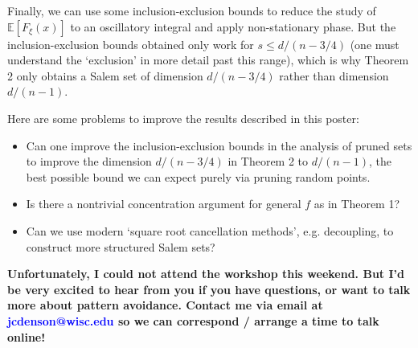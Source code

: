 \documentclass[12pt]{article}
\numberwithin{equation}{section}
\theoremstyle{plain}
\theoremstyle{remark}
\newcommand{\newpart}[1]
{\colorbox[rgb]{0.97,0.92,0.7}{\makebox[0.97\columnwidth]
{\rule[-1.2ex]{0pt}{3.7ex}\partfont{#1}}}\bigskip}
\newcommand{\partfont}[1]{{\Large \textsf{\textbf{#1}}}}
\begin{document}
{{\begin{multicols}{2}
{\vspace{0.1cm}

Finally, we can use some inclusion-exclusion bounds to reduce the study of $\mathbb{E}[F_\xi(x)]$ to an oscillatory integral and apply non-stationary phase. But the inclusion-exclusion bounds obtained only work for $s \leq d/(n-3/4)$ (one must understand the `exclusion' in more detail past this range), which is why Theorem 2 only obtains a Salem set of dimension $d/(n-3/4)$ rather than dimension $d/(n-1)$.
}

\vspace{0.2cm}

\newpart{What's Next}

\large{Here are some problems to improve the results described in this poster:

\begin{itemize}
    \item Can one improve the inclusion-exclusion bounds in the analysis of pruned sets to improve the dimension $d/(n-3/4)$ in Theorem 2 to $d/(n-1)$, the best possible bound we can expect purely via pruning random points.

    \item Is there a nontrivial concentration argument for general $f$ as in Theorem 1?


    \item Can we use modern `square root cancellation methods', e.g. decoupling, to construct more structured Salem sets?
\end{itemize}
%
{\bf
Unfortunately, I could not attend the workshop this weekend. But I'd be very excited to hear from you if you have questions, or want to talk more about pattern avoidance. Contact me via email at \textcolor{blue}{jcdenson@wisc.edu} so we can correspond / arrange a time to talk online!}

\vspace{0.5cm}}



\end{multicols}}}
\end{document}
